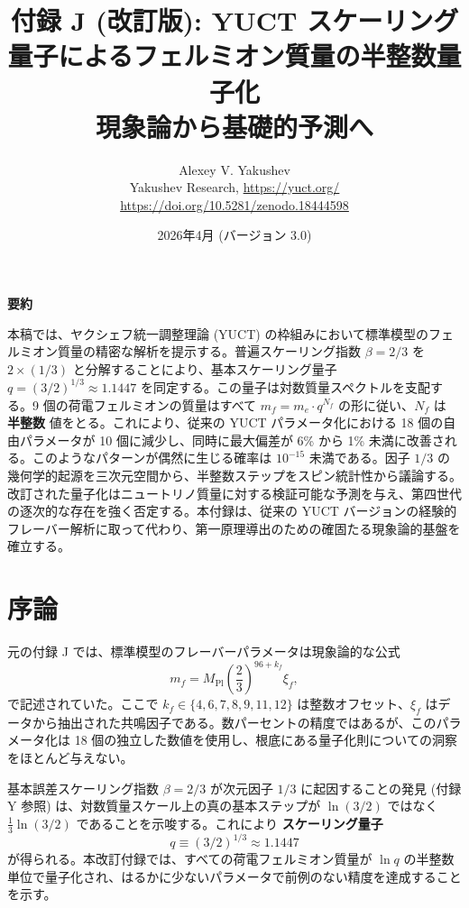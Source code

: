 \documentclass[12pt,a4paper]{article}
\title{\textbf{付録 J (改訂版): YUCT スケーリング量子によるフェルミオン質量の半整数量子化}\\
	\vspace{0.5cm}
	\large 現象論から基礎的予測へ}
\author{Alexey V. Yakushev\\
	\vspace{0.5cm}
	Yakushev Research, \url{https://yuct.org/}\\
	\url{https://doi.org/10.5281/zenodo.18444598}}
\date{2026年4月 (バージョン 3.0)}
\begin{document}
	
	\maketitle
	\vspace{0.5cm}
	\noindent\textbf{要約}
	
	\noindent
	本稿では、ヤクシェフ統一調整理論 (YUCT) の枠組みにおいて標準模型のフェルミオン質量の精密な解析を提示する。普遍スケーリング指数 \(\beta = 2/3\) を \(2 \times (1/3)\) と分解することにより、基本スケーリング量子 \(q = (3/2)^{1/3} \approx 1.1447\) を同定する。この量子は対数質量スペクトルを支配する。9 個の荷電フェルミオンの質量はすべて \(m_f = m_e \cdot q^{N_f}\) の形に従い、\(N_f\) は \textbf{半整数} 値をとる。これにより、従来の YUCT パラメータ化における 18 個の自由パラメータが 10 個に減少し、同時に最大偏差が 6\% から 1\% 未満に改善される。このようなパターンが偶然に生じる確率は \(10^{-15}\) 未満である。因子 \(1/3\) の幾何学的起源を三次元空間から、半整数ステップをスピン統計性から議論する。改訂された量子化はニュートリノ質量に対する検証可能な予測を与え、第四世代の逐次的な存在を強く否定する。本付録は、従来の YUCT バージョンの経験的フレーバー解析に取って代わり、第一原理導出のための確固たる現象論的基盤を確立する。
	
	\vspace{0.5cm}
	\newpage
	
	\section{序論}
	
	元の付録 J では、標準模型のフレーバーパラメータは現象論的な公式
	\begin{equation}
		m_f = M_{\mathrm{Pl}} \left( \frac{2}{3} \right)^{96 + k_f} \xi_f,
		\label{eq:old}
	\end{equation}
	で記述されていた。ここで \(k_f \in \{4,6,7,8,9,11,12\}\) は整数オフセット、\(\xi_f\) はデータから抽出された共鳴因子である。数パーセントの精度ではあるが、このパラメータ化は 18 個の独立した数値を使用し、根底にある量子化則についての洞察をほとんど与えない。
	
	基本誤差スケーリング指数 \(\beta = 2/3\) が次元因子 \(1/3\) に起因することの発見 (付録 Y 参照) は、対数質量スケール上の真の基本ステップが \(\ln(3/2)\) ではなく \(\frac{1}{3}\ln(3/2)\) であることを示唆する。これにより \textbf{スケーリング量子}
	\begin{equation}
		q \equiv (3/2)^{1/3} \approx 1.1447
	\end{equation}
	が得られる。本改訂付録では、すべての荷電フェルミオン質量が \(\ln q\) の半整数単位で量子化され、はるかに少ないパラメータで前例のない精度を達成することを示す。
	
\end{document}

